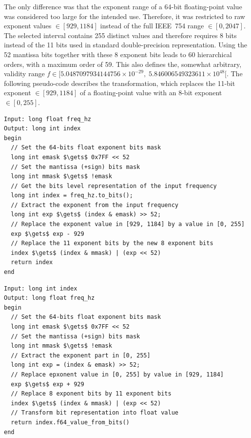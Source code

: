 The only difference was that the exponent range of a 64-bit floating-point value was considered too
large for the intended use. Therefore, it was restricted to raw exponent values
$\in [929, 1184]$ instead of the full IEEE~754 range $\in [0, 2047]$.
The selected interval contains 255 distinct values and therefore requires 8 bits
instead of the 11 bits used in standard double-precision representation.
Using the 52 mantissa bits together with these 8 exponent bits leads to 60 hierarchical
orders, with a maximum order of 59. This also defines the, somewhat arbitrary, validity range
$f \in [5.0487097934144756 \times 10^{-29},\; 5.846006549323611 \times 10^{48}[$.
The following pseudo-code describes the transformation, which replaces the
11-bit exponent $\in [929,1184]$ of a floating-point value with an 8-bit exponent
$\in [0,255]$.
\begin{lstlisting}[language=Pseudocode,mathescape=true,caption=Frequency in Hz to order 59 index routine,label={code:freq2index}]
Input: long float freq_hz
Output: long int index
begin
  // Set the 64-bits float exponent bits mask
  long int emask $\gets$ 0x7FF << 52
  // Set the mantissa (+sign) bits mask
  long int mmask $\gets$ !emask
  // Get the bits level representation of the input frequency
  long int index = freq_hz.to_bits();
  // Extract the exponent from the input frequency
  long int exp $\gets$ (index & emask) >> 52;
  // Replace the exponent value in [929, 1184] by a value in [0, 255]  
  exp $\gets$ exp - 929
  // Replace the 11 exponent bits by the new 8 exponent bits
  index $\gets$ (index & mmask) | (exp << 52)
  return index
end
\end{lstlisting}


\begin{lstlisting}[language=Pseudocode,mathescape=true,caption=Frequency in Hz from order 59 index routine,label={code:index2freq}]
Input: long int index
Output: long float freq_hz
begin
  // Set the 64-bits float exponent bits mask
  long int emask $\gets$ 0x7FF << 52
  // Set the mantissa (+sign) bits mask 
  long int mmask $\gets$ !emask
  // Extract the exponent part in [0, 255]
  long int exp = (index & emask) >> 52;
  // Replace epxonent value in [0, 255] by value in [929, 1184]
  exp $\gets$ exp + 929
  // Replace 8 exponent bits by 11 exponent bits
  index $\gets$ (index & mmask) | (exp << 52)
  // Transform bit representation into float value
  return index.f64_value_from_bits()
end
\end{lstlisting}

